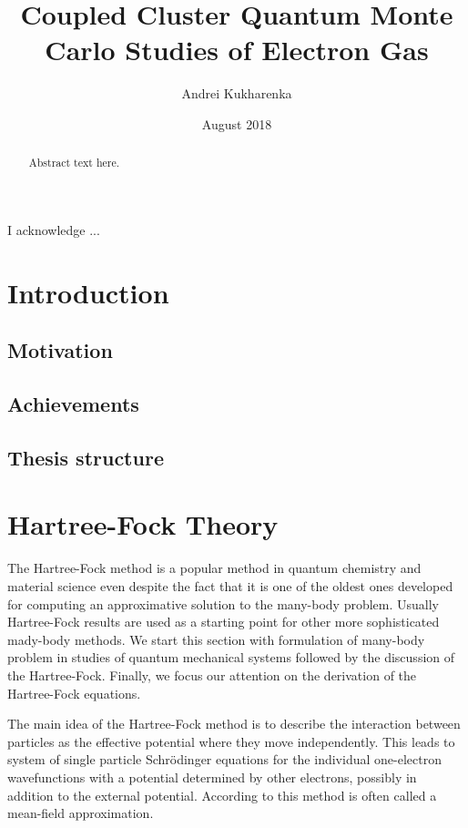\documentclass[twoside,english]{uiofysmaster}
\author{Andrei Kukharenka}
\title{Coupled Cluster Quantum Monte Carlo Studies
	of Electron Gas}
\date{August 2018}
\begin{document}
	
	\maketitle
	
	\begin{abstract}
		Abstract text here.
	\end{abstract}
	
	
	\begin{acknowledgements}
		I acknowledge ...
	\end{acknowledgements}
	
	\tableofcontents
	
\chapter{Introduction}
	
\section{Motivation }
\section{Achievements }
\section{Thesis structure}




\chapter{Hartree-Fock Theory}\label{Ch:HF}


The Hartree-Fock method is a popular method in quantum chemistry and material science even despite the fact that it is one of the oldest ones developed for computing an approximative solution to the many-body problem. Usually Hartree-Fock results are used as a starting point for other more sophisticated mady-body methods.
We start this section with formulation of many-body problem in studies of quantum mechanical systems followed by the discussion of the Hartree-Fock. Finally, we focus our attention on the derivation of the Hartree-Fock equations.

The main idea of the Hartree-Fock method is to describe the interaction between particles as the effective potential where they move independently. This leads to system of single particle Schr\"{o}dinger equations for the individual one-electron wavefunctions with a potential determined by other electrons, possibly in addition to the external potential. According to this method is often called a mean-field approximation.  \\
 
\end{document}
